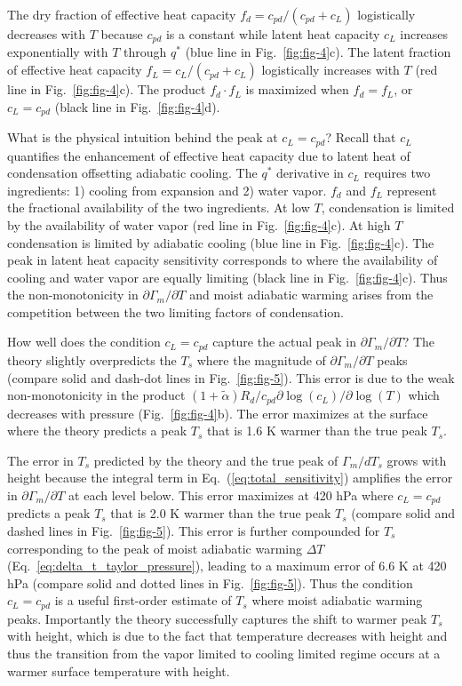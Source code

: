 \documentclass[draft]{ametsocV6.1}
\begin{document}
The dry fraction of effective heat capacity $f_d=c_{pd}/(c_{pd}+c_L)$ logistically decreases with $T$ because $c_{pd}$ is a constant while latent heat capacity $c_L$ increases exponentially with $T$ through $q^*$ (blue line in Fig.~\ref{fig:fig-4}c). The latent fraction of effective heat capacity $f_L = c_L / (c_{pd}+c_L)$ logistically increases with $T$ (red line in Fig.~\ref{fig:fig-4}c). The product $f_d\cdot f_L$ is maximized when $f_d=f_L$, or $c_L = c_{pd}$ (black line in Fig.~\ref{fig:fig-4}d).

What is the physical intuition behind the peak at $c_L = c_{pd}$? Recall that $c_L$ quantifies the enhancement of effective heat capacity due to latent heat of condensation offsetting adiabatic cooling. The $q^*$ derivative in $c_L$ requires two ingredients: 1) cooling from expansion and 2) water vapor. $f_d$ and $f_L$ represent the fractional availability of the two ingredients. At low $T$, condensation is limited by the availability of water vapor (red line in Fig.~\ref{fig:fig-4}c). At high $T$ condensation is limited by adiabatic cooling (blue line in Fig.~\ref{fig:fig-4}c). The peak in latent heat capacity sensitivity corresponds to where the availability of cooling and water vapor are equally limiting (black line in Fig.~\ref{fig:fig-4}c). Thus the non-monotonicity in $\partial\Gamma_m/\partial T$ and moist adiabatic warming arises from the competition between the two limiting factors of condensation.

How well does the condition $c_L = c_{pd}$ capture the actual peak in $\partial\Gamma_m/\partial T$? The theory slightly overpredicts the $T_s$ where the magnitude of $\partial\Gamma_m/\partial T$ peaks (compare solid and dash-dot lines in Fig.~\ref{fig:fig-5}). This error is due to the weak non-monotonicity in the product $(1+\tilde{\alpha})R_d/c_{pd}\partial\log(c_L)/\partial\log(T)$ which decreases with pressure (Fig.~\ref{fig:fig-4}b). The error maximizes at the surface where the theory predicts a peak $T_s$ that is 1.6 K warmer than the true peak $T_s$. 

The error in $T_s$ predicted by the theory and the true peak of $\Gamma_m / d T_s$ grows with height because the integral term in Eq.~(\ref{eq:total_sensitivity}) amplifies the error in $\partial\Gamma_m / \partial T$ at each level below. This error maximizes at 420 hPa where $c_L = c_{pd}$ predicts a peak $T_s$ that is 2.0 K warmer than the true peak $T_s$ (compare solid and dashed lines in Fig.~\ref{fig:fig-5}). This error is further compounded for $T_s$ corresponding to the peak of moist adiabatic warming $\Delta T$ (Eq.~\ref{eq:delta_t_taylor_pressure}), leading to a maximum error of 6.6 K at 420 hPa (compare solid and dotted lines in Fig.~\ref{fig:fig-5}). Thus the condition $c_L = c_{pd}$ is a useful first-order estimate of $T_s$ where moist adiabatic warming peaks. Importantly the theory successfully captures the shift to warmer peak $T_s$ with height, which is due to the fact that temperature decreases with height and thus the transition from the vapor limited to cooling limited regime occurs at a warmer surface temperature with height.
\end{document}
